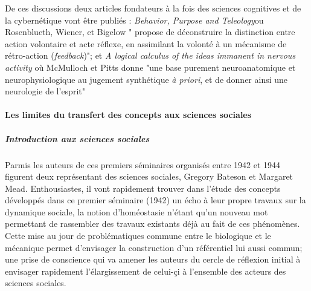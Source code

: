 {De ces discussions deux articles fondateurs à la fois des sciences cognitives \autocite[23]{Dupuy2000} et de la cybernétique vont être publiés : \textit{Behavior, Purpose and Teleology}ou Rosenblueth, Wiener, et Bigelow " propose de déconstruire la distinction entre action volontaire et acte réflexe, en assimilant la volonté à un mécanisme de rétro-action (\textit{feedback})"; et \textit{A logical calculus of the ideas immanent in nervous activity} où McMulloch et Pitts donne "une base purement neuroanatomique et neurophysiologique au jugement synthétique \textit{à priori}, et de donner ainsi une neurologie de l'esprit"

\paragraph{ Les limites du transfert des concepts aux sciences sociales}

\subparagraph{Introduction aux sciences sociales}
Parmis les auteurs de ces premiers séminaires organisés entre 1942 et 1944 figurent deux représentant des sciences sociales, Gregory Bateson et Margaret Mead. Enthousiastes, il vont rapidement trouver dans l'étude des concepts développés dans ce premier séminaire (1942) un écho à leur propre travaux sur la dynamique sociale, la notion d'homéostasie n'étant qu'un nouveau mot permettant de rassembler des travaux existants déjà au fait de ces phénomènes. Cette mise au jour de problématiques commune entre le biologique et le mécanique permet d'envisager la construction d'un référentiel lui aussi commun; une prise de conscience qui va amener les auteurs du cercle de réflexion initial à envisager rapidement l'élargissement de celui-çi à l'ensemble des acteurs des sciences sociales.

}
